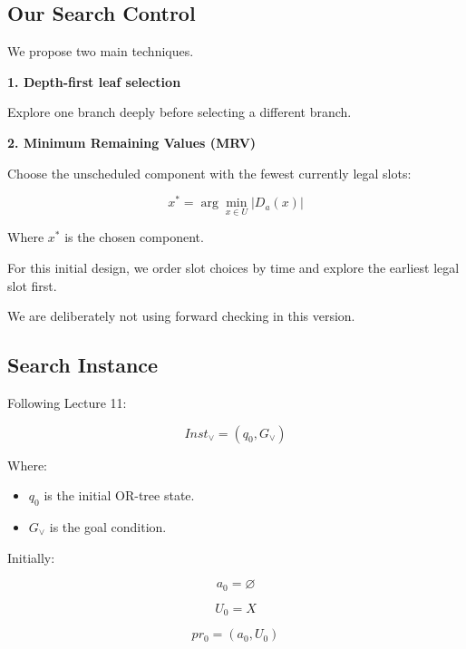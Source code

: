 \documentclass[11pt,letterpaper]{article}
\newcommand{\Inst}{\mathit{Inst}}
\begin{document}
\subsection{Our Search Control}

We propose two main techniques.

\textbf{1. Depth-first leaf selection}

Explore one branch deeply before
selecting a different branch.

\textbf{2. Minimum Remaining Values (MRV)}

Choose the unscheduled component
with the fewest currently legal slots:

\begin{equation}
\boxed{
x^*=
\arg\min_{x\in U}|D_a(x)|
}
\end{equation}

Where $x^*$ is the chosen component.

For this initial design, we order slot
choices by time and explore the earliest
legal slot first.

We are deliberately not using
forward checking in this version.

\subsection{Search Instance}

Following Lecture 11:

\begin{equation}
\boxed{
\Inst_{\lor}=
(q_0,G_{\lor})
}
\end{equation}

Where:

\begin{itemize}
    \item $q_0$ is the initial OR-tree state.
    \item $G_{\lor}$ is the goal condition.
\end{itemize}

Initially:

\begin{equation}
\boxed{
a_0=\varnothing
}
\end{equation}

\begin{equation}
\boxed{
U_0=X
}
\end{equation}

\begin{equation}
\boxed{
pr_0=(a_0,U_0)
}
\end{equation}
\end{document}
